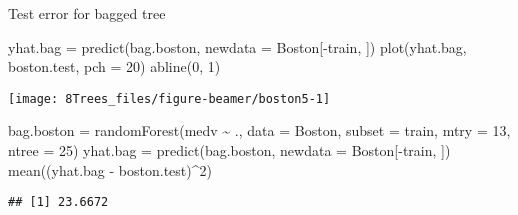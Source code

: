 \documentclass[
  10pt,
  ignorenonframetext,
]{beamer}
\newenvironment{Shaded}{\begin{snugshade}}{\end{snugshade}}
\newcommand{\AttributeTok}[1]{\textcolor[rgb]{0.77,0.63,0.00}{#1}}
\newcommand{\DecValTok}[1]{\textcolor[rgb]{0.00,0.00,0.81}{#1}}
\newcommand{\FunctionTok}[1]{\textcolor[rgb]{0.00,0.00,0.00}{#1}}
\newcommand{\NormalTok}[1]{#1}
\newcommand{\OtherTok}[1]{\textcolor[rgb]{0.56,0.35,0.01}{#1}}
\newcommand{\SpecialCharTok}[1]{\textcolor[rgb]{0.00,0.00,0.00}{#1}}
\begin{document}
\begin{frame}[fragile]
\begin{block}{Test error for bagged tree}
\protect\hypertarget{test-error-for-bagged-tree}{}
\(~\)

\scriptsize

\begin{Shaded}
\begin{Highlighting}[]
\NormalTok{yhat.bag }\OtherTok{=} \FunctionTok{predict}\NormalTok{(bag.boston, }\AttributeTok{newdata =}\NormalTok{ Boston[}\SpecialCharTok{{-}}\NormalTok{train, ])}
\FunctionTok{plot}\NormalTok{(yhat.bag, boston.test, }\AttributeTok{pch =} \DecValTok{20}\NormalTok{)}
\FunctionTok{abline}\NormalTok{(}\DecValTok{0}\NormalTok{, }\DecValTok{1}\NormalTok{)}
\end{Highlighting}
\end{Shaded}

\begin{center}\texttt{[image: 8Trees\_files/figure-beamer/boston5-1]} \end{center}

\vspace{2mm}

\scriptsize

\begin{Shaded}
\begin{Highlighting}[]
\NormalTok{bag.boston }\OtherTok{=} \FunctionTok{randomForest}\NormalTok{(medv }\SpecialCharTok{\textasciitilde{}}\NormalTok{ ., }\AttributeTok{data =}\NormalTok{ Boston, }\AttributeTok{subset =}\NormalTok{ train, }\AttributeTok{mtry =} \DecValTok{13}\NormalTok{,}
    \AttributeTok{ntree =} \DecValTok{25}\NormalTok{)}
\NormalTok{yhat.bag }\OtherTok{=} \FunctionTok{predict}\NormalTok{(bag.boston, }\AttributeTok{newdata =}\NormalTok{ Boston[}\SpecialCharTok{{-}}\NormalTok{train, ])}
\FunctionTok{mean}\NormalTok{((yhat.bag }\SpecialCharTok{{-}}\NormalTok{ boston.test)}\SpecialCharTok{\^{}}\DecValTok{2}\NormalTok{)}
\end{Highlighting}
\end{Shaded}

\begin{verbatim}
## [1] 23.6672
\end{verbatim}
\end{block}
\end{frame}
\end{document}
